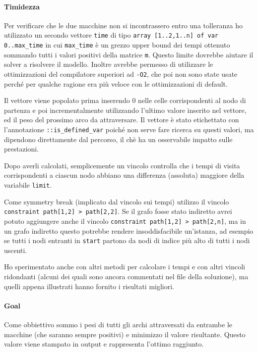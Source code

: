 \documentclass[12pt, a4paper]{article}
\begin{document}
\paragraph{Timidezza}
Per verificare che le due macchine non si incontrassero entro una tolleranza ho utilizzato un secondo vettore \lstinline{time} di tipo \lstinline{array [1..2,1..n] of var 0..max_time} in cui \lstinline{max_time} è un grezzo upper bound dei tempi ottenuto sommando tutti i valori positivi della matrice \lstinline{m}.
Questo limite dovrebbe aiutare il solver a risolvere il modello. Inoltre avrebbe permesso di utilizzare le ottimizzazioni del compilatore superiori ad \lstinline{-O2}, che poi non sono state usate perché per qualche ragione era più veloce con le ottimizzazioni di default.

Il vettore viene popolato prima inserendo $0$ nelle celle corrispondenti al nodo di partenza e poi incrementalmente utilizzando l'ultimo valore inserito nel vettore, ed il peso del prossimo arco da attraversare. Il vettore è stato etichettato con l'annotazione \lstinline{::is_defined_var} poiché non serve fare ricerca su questi valori, ma dipendono direttamente dal percorso, il chè ha un osservabile impatto sulle prestazioni.

Dopo averli calcolati, semplicemente un vincolo controlla che i tempi di visita corrispondenti a ciascun nodo abbiano una differenza (assoluta) maggiore della variabile \lstinline{limit}.

Come symmetry break (implicato dal vincolo sui tempi) utilizzo il vincolo \lstinline{constraint path[1,2] > path[2,2]}.
Se il grafo fosse stato indiretto avrei potuto aggiungere anche il vincolo \lstinline{constraint path[1,2] > path[2,n]}, ma in un grafo indiretto questo potrebbe rendere insoddisfacibile un'istanza, ad esempio se tutti i nodi entranti in \lstinline{start} partono da nodi di indice più alto di tutti i nodi uscenti.

Ho sperimentato anche con altri metodi per calcolare i tempi e con altri vincoli ridondanti (alcuni dei quali sono ancora commentati nel file della soluzione), ma quelli appena illustrati hanno fornito i risultati migliori.

\paragraph{Goal}
Come obbiettivo sommo i pesi di tutti gli archi attraversati da entrambe le macchine (che saranno sempre positivi) e minimizzo il valore risultante.
Questo valore viene stampato in output e rappresenta l'ottimo raggiunto.
\end{document}
